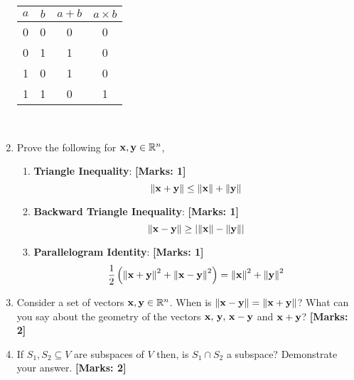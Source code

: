 \documentclass[12pt]{article}
\def\mf{\ensuremath\mathbf}
\begin{document}
\begin{enumerate}
    \begin{center}
        \begin{minipage}[h]{.45\textwidth}
            \centering
            \begin{tabular}{|c|c|c|c|}
                \hline
                $a$ & $b$ & $a+b$ & $a \times b$ \\ \hline
                0 & 0 & 0   & 0     \\ \hline
                0 & 1 & 1   & 0     \\ \hline
                1 & 0 & 1   & 0     \\ \hline
                1 & 1 & 0   & 1     \\ \hline
            \end{tabular}\\
        \end{minipage}
    \end{center}
        
    \item Prove the following for $\mf{x}, \mf{y} \in \mathbb{R}^n$,
    \begin{enumerate}
        \item {\small \textbf{Triangle Inequality}}: \textbf{[Marks: 1]}
        \[ \left\lVert \mf{x} + \mf{y}\right\rVert \leq \left\lVert \mf{x}\right\rVert + \left\lVert \mf{y}\right\rVert \]
        \item {\small \textbf{Backward Triangle Inequality}}: \textbf{[Marks: 1]}
        \[ \left\lVert \mf{x} - \mf{y}\right\rVert  \geq \left\lvert \left\lVert \mf{x}\right\rVert - \left\lVert \mf{y}\right\rVert \right\rvert \]
        \item {\small \textbf{Parallelogram Identity}}: \textbf{[Marks: 1]}
        \[ \frac{1}{2} \left(\left\lVert \mf{x} + \mf{y}\right\rVert^2 + \left\lVert \mf{x} - \mf{y}\right\rVert^2 \right) = \left\lVert \mf{x}\right\rVert^2 + \left\lVert \mf{y}\right\rVert^2 \]
    \end{enumerate}

    \item Consider a set of vectors $\mf{x}, \mf{y} \in \mathbb{R}^n$. When is $\left\lVert \mf{x} - \mf{y} \right\rVert = \left\lVert \mf{x} + \mf{y}\right\rVert$? What can you say about the geometry of the vectors $\mf{x},\,\mf{y},\,\mf{x} - \mf{y}$ and $\mf{x} + \mf{y}$? \textbf{[Marks: 2]}
    
    \item If $S_1, S_2 \subseteq V$ are subspaces of $V$ then, is $S_1 \cap S_2$ a subspace? Demonstrate your answer. \textbf{[Marks: 2]}
    

\end{enumerate}
\end{document}
